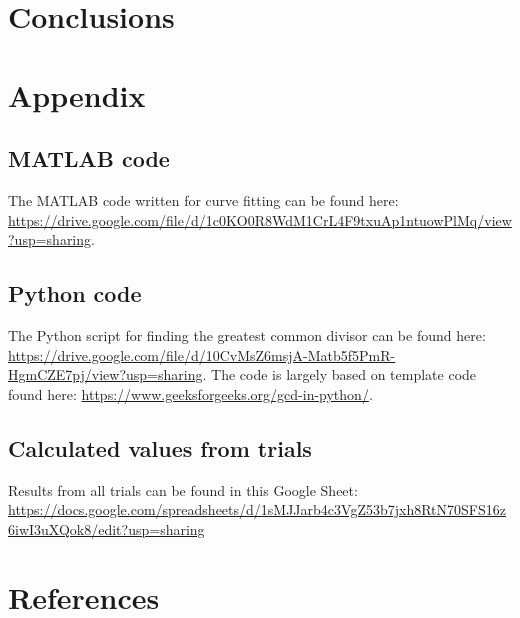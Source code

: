 \documentclass[12pt,twocolumn,letterpaper]{article}
\begin{document}
\section{Conclusions}



\section{Appendix}
\subsection{MATLAB code} \label{matlabCodeAppendix}
The MATLAB code written for curve fitting can be found here: \url{https://drive.google.com/file/d/1c0KO0R8WdM1CrL4F9txuAp1ntuowPlMq/view?usp=sharing}.

\subsection{Python code} \label{pythonCodeAppendix}
The Python script for finding the greatest common divisor can be found here: \url{https://drive.google.com/file/d/10CvMsZ6msjA-Matb5f5PmR-HgmCZE7pj/view?usp=sharing}. The code is largely based on template code found here: \url{https://www.geeksforgeeks.org/gcd-in-python/}.

\subsection{Calculated values from trials}\label{resultsAppendix}
Results from all trials can be found in this Google Sheet: \url{https://docs.google.com/spreadsheets/d/1sMJJarb4c3VgZ53b7jxh8RtN70SFS16z6iwI3uXQok8/edit?usp=sharing}

\section{References}
\end{document}
